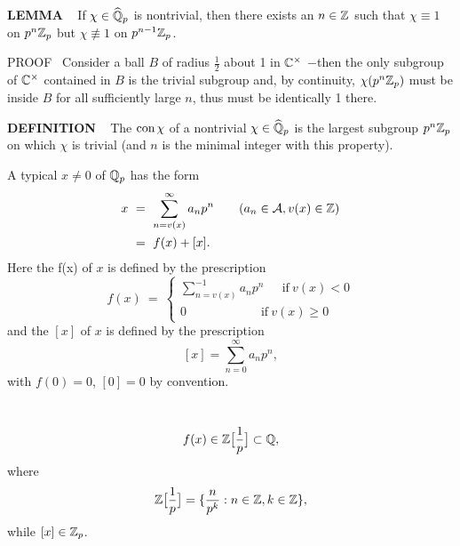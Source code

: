 \vspace{0.1cm}

\begin{x}{\small\bf LEMMA} \ %
If $\chi \in \widehat{\mathbb{Q}}_p$ is nontrivial, then there exists an $n \in \mathbb{Z}$ such that $\chi \equiv 1$ on $p^n\mathbb{Z}_p$ but $\chi \not\equiv 1$ on $p^{n-1}\mathbb{Z}_p$.

\vspace{0.1cm}

PROOF \  Consider a ball $B$ of radius $\frac{1}{2}$ about 1 in 
$\mathbb{C}^\times$ $-$then the only subgroup of  $\mathbb{C}^\times$ contained in $B$ is the trivial subgroup and, by continuity, $\chi(p^n \mathbb{Z}_p)$ must be inside $B$ for all sufficiently large $n$, thus must be 
identically 1 there.
\end{x}
\vspace{0.1cm}

\begin{x}{\small\bf DEFINITION} \ %
The 
$\text{con}\hspace{0.05cm} \chi$ of a nontrivial $\chi \in \widehat{\mathbb{Q}}_p$ is the largest subgroup $p^n \mathbb{Z}_p$ 
on which $\chi$ is trivial (and $n$ is the minimal integer with this property).

\vspace{0.2cm}

A typical $x \ne 0$ of $\mathbb{Q}_p$ has the form
\begin{align*}
x \ 
&=\  \sum_{n = v(x)}^\infty a_n p^n \qquad ( a_n \in \sA, v(x) \in \Z) \\
&=\  f(x) + [x].
\end{align*}
Here the 
f(x) of $x$ is defined by the prescription
\[
f(x) \ = \ 
\begin{cases}
\sum\limits_{n = v(x)}^{-1} a_np^n \quad \ \   \text{if} \  v(x) < 0\\
0  \qquad\qquad\qquad \text{if} \ v(x) \geq 0
\end{cases}
\]
and the 
$[x]$ of $x$ is defined by the prescription
\[
[x] = \sum_{n = 0 }^\infty a_np^n,
\]
with $f(0) = 0$, $[0] = 0$ by convention.
\end{x}
\vspace{0.1cm}

\begin{x}{\small\bf {}} \ %
\[
f(x) \in \mathbb{Z}\bigl[\frac{1}{p}\bigr] \subset \mathbb{Q},
\]
where
\[
\mathbb{Z}\bigl[\frac{1}{p}\bigr] = \{\frac{n}{p^k}: n \in \mathbb{Z}, k \in \mathbb{Z}\},
\]
while $[x] \in \mathbb{Z}_p$.
\end{x}
\vspace{0.1cm}


